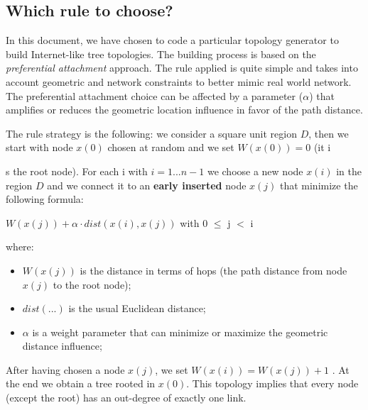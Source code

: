 \documentclass[a4paper,12pt]{article}
\begin{document}
\subsection{Which rule to choose?}
\label{sec:rule}

In this document, we have chosen to code a particular topology generator
to build Internet-like tree topologies. The building process is based
on the \emph{preferential attachment} approach. The rule applied is
quite simple and takes into account geometric and network constraints
to better mimic real world network. The preferential attachment choice
can be affected by a parameter ($ \alpha $) that amplifies or reduces the
geometric location influence in favor of the path distance. 

The rule strategy is the following: we consider a square unit region
$D$, then we start with node $x(0)$ chosen at random and we set $W(x(0))
= 0$ (it i

s the root node). For each i with $i = 1...n-1$ we choose a
new node $x(i)$ in the region $D$ and we connect it to an \textbf{early
inserted} node $x(j)$ that minimize the following formula:

\begin{center}
$W(x(j)) + \alpha \cdot dist(x(i), x(j))$ with 0 $\leq$ j $<$ i
\end{center}

where: 

\begin{itemize}
\item $W(x(j))$ is the distance in terms of hops (the path distance from node
$x(j)$ to the root node); 
\item $dist(...)$ is the usual Euclidean distance; 
\item $ \alpha $ is a weight parameter that can minimize or maximize 
the geometric distance influence;
 
\end{itemize}

After having chosen a node $x(j)$, we set $W(x(i)) = W(x(j))+1$ . At
the end we obtain a tree rooted in $x(0)$. This topology implies that
every node (except the root) has an out-degree of exactly one link.

\end{document}
